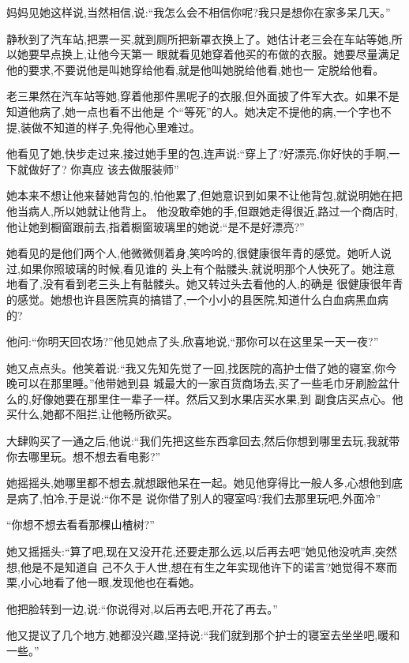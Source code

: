 ﻿\documentclass[12pt]{article}
\begin{document}
妈妈见她这样说,当然相信,说:``我怎么会不相信你呢?我\myrule 只是想你在家多呆几天。''

静秋到了汽车站,把票一买,就到厕所把新罩衣换上了。她估计老三会在车站等她,所以她要早点换上,让他今天第一
眼就看见她穿着他买的布做的衣服。她要尽量满足他的要求,不要说他是叫她穿给他看,就是他叫她脱给他看,她也一
定脱给他看。

老三果然在汽车站等她,穿着他那件黑呢子的衣服,但外面披了件军大衣。如果不是知道他病了,她一点也看不出他是
个``等死''的人。她决定不提他的病,一个字也不提,装做不知道的样子,免得他心里难过。

他看见了她,快步走过来,接过她手里的包,连声说:``穿上了?好漂亮,你好快的手啊,一下就\myrule 做好了? 你真应
该去做服装师\myrule ''

她本来不想让他来替她背包的,怕他累了,但她意识到如果不让他背包,就说明她在把他当病人,所以她就让他背上。
他没敢牵她的手,但跟她走得很近,路过一个商店时,他让她到橱窗跟前去,指着橱窗玻璃里的她说:``是不是好漂亮?''

她看见的是他们两个人,他微微侧着身,笑吟吟的,很健康很年青的感觉。她听人说过,如果你照玻璃的时候,看见谁的
头上有个骷髅头,就说明那个人快死了。她注意地看了,没有看到老三头上有骷髅头。她又转过头去看他的人,的确是
很健康很年青的感觉。她想也许县医院真的搞错了,一个小小的县医院,知道什么白血病黑血病的?

他问:``你\myrule 明天回农场?''他见她点了头,欣喜地说,``那你\myrule 可以在这里呆一天一夜?''

她又点点头。他笑着说:``我又先知先觉了一回,找医院的高护士借了她的寝室,你今晚可以在那里睡。''他带她到县
城最大的一家百货商场去,买了一些毛巾牙刷脸盆什么的,好像她要在那里住一辈子一样。然后又到水果店买水果,到
副食店买点心。他买什么,她都不阻拦,让他畅所欲买。

大肆购买了一通之后,他说:``我们先把这些东西拿回去,然后你想到哪里去玩,我就带你去哪里玩。想不想去看电影?''

她摇摇头,她哪里都不想去,就想跟他呆在一起。她见他穿得比一般人多,心想他到底是病了,怕冷,于是说:``你不是
说你借了别人的寝室吗?我们去那里玩吧,外面冷\myrule ''

``你\myrule 想不想去\myrule 看看那棵山楂树?''

她又摇摇头:``算了吧,现在又没开花,还要走那么远,以后再去吧\myrule ''她见他没吭声,突然想,他是不是知道自
己不久于人世,想在有生之年实现他许下的诺言?她觉得不寒而栗,小心地看了他一眼,发现他也在看她。

他把脸转到一边,说:``你说得对,以后再去吧,开花了再去。''

他又提议了几个地方,她都没兴趣,坚持说:``我们就到那个护士的寝室去坐坐吧,暖和一些。''
\end{document}
